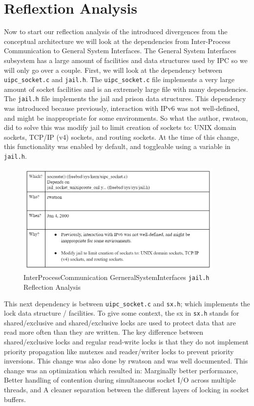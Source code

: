 \documentclass[12pt, dvipsnames, a4paper]{article}
\newcommand{\code}[1]{\texttt{#1}}
\begin{document}
\section{Reflextion Analysis}
Now to start our reflection analysis of the introduced divergences from the conceptual architecture  we will look at the dependencies from Inter-Process Communication to General System Interfaces. The General System Interfaces subsystem has a large amount of facilities and data structures used by IPC so we will only go over a couple. First, we will look at the dependency between \code{uipc\_socket.c} and \code{jail.h}. The \code{uipc\_socket.c} file implements a very large amount of socket facilities and is an extremely large file with many dependencies. The \code{jail.h} file implements the jail and prison data structures. This dependency was introduced because previously, interaction with IPv6 was not well-defined, and might be inappropriate for some environments. So what the author, rwatson, did to solve this was modify jail to limit creation of sockets to: UNIX domain sockets, TCP/IP (v4) sockets, and routing sockets. At the time of this change, this functionality was enabled by default, and toggleable using a variable in \code{jail.h}.
\clearpage
\begin{figure}
	\centering
	\includegraphics[width=290pt]{assets/IPC_Jail.png}
	\caption{InterProcessCommunication \-\> GerneralSystemInterfaces \code{jail.h} Reflection Analysis}
\end{figure}

This next dependency is between \code{uipc\_socket.c} and \code{sx.h}; which implements the lock data structure / facilities. To give some context, the sx in \code{sx.h} stands for shared/exclusive and shared/exclusive locks are used to protect data that are read more often than they are written. The key difference between shared/exclusive locks and regular read-write locks is that they do not implement priority propagation like mutexes and reader/writer locks to prevent priority inversions. This change was also done by rwatson and was well documented. This change was an optimization which resulted in: Marginally better performance, Better handling of contention during simultaneous socket I/O across multiple threads, and A cleaner separation between the different layers of locking in socket buffers.
\end{document}

